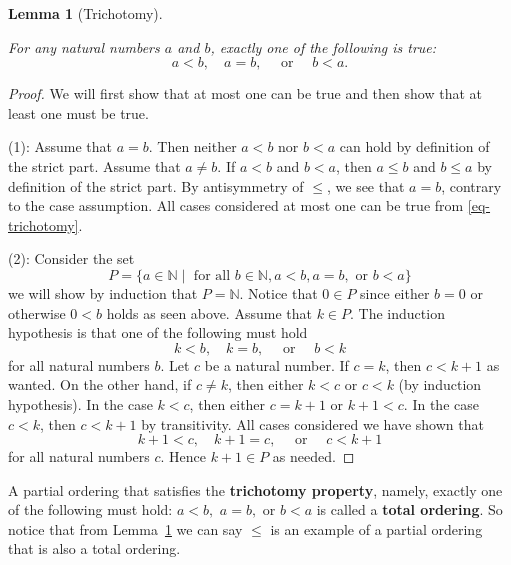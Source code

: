 \documentclass[
  twoside,
  12pt,
  letterpaper]{article}
\theoremstyle{definition}
\theoremstyle{definition}
\theoremstyle{plain}
\theoremstyle{definition}
\theoremstyle{plain}
\newtheorem{lemma}{Lemma}[section]
\theoremstyle{remark}
\begin{document}
\begin{lemma}[Trichotomy]\protect\hypertarget{lem-trichotomy}{}\label{lem-trichotomy}

For any natural numbers \(a\) and \(b\), exactly one of the following is
true: \begin{equation}
\label{eq-trichotomy}
a < b, \quad a = b, \quad \text{ or } \quad b < a.
\end{equation}

\end{lemma}

\begin{proof}

We will first show that at most one can be true and then show that at
least one must be true.

(1): Assume that \(a=b\). Then neither \(a<b\) nor \(b<a\) can hold by
definition of the strict part. Assume that \(a\neq b\). If \(a<b\) and
\(b<a\), then \(a\leq b\) and \(b\leq a\) by definition of the strict
part. By antisymmetry of \(\leq\), we see that \(a=b\), contrary to the
case assumption. All cases considered at most one can be true from
\eqref{eq-trichotomy}.

(2): Consider the set \[
P =\{ a\in \mathbb{N} \mid \text{ for all } b\in \mathbb{N}, a < b, a=b, \text{ or } b < a \}
\] we will show by induction that \(P=\mathbb{N}\). Notice that
\(0\in P\) since either \(b=0\) or otherwise \(0<b\) holds as seen
above. Assume that \(k\in P\). The induction hypothesis is that one of
the following must hold \begin{equation}
\label{eq-trichotomy-hypothesis}
k < b, \quad k = b, \quad \text{ or } \quad b < k
\end{equation} for all natural numbers \(b\). Let \(c\) be a natural
number. If \(c=k\), then \(c < k+1\) as wanted. On the other hand, if
\(c\neq k\), then either \(k<c\) or \(c<k\) (by induction hypothesis).
In the case \(k < c\), then either \(c=k+1\) or \(k+1 < c.\) In the case
\(c < k\), then \(c < k+1\) by transitivity. All cases considered we
have shown that \begin{equation}
\label{eq-trichotomy-hypothesis-two}
k+1 < c, \quad k+1 = c, \quad \text{ or } \quad c < k+1
\end{equation} for all natural numbers \(c\). Hence \(k+1\in P\) as
needed.

\end{proof}

A partial ordering that satisfies the \textbf{trichotomy property},
namely, exactly one of the following must hold: \(a < b,\) \(a = b,\) or
\(b < a\) is called a \textbf{total ordering}. So notice that from
Lemma~\ref{lem-trichotomy} we can say \(\leq\) is an example of a
partial ordering that is also a total ordering.
\end{document}
